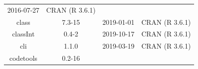 \documentclass[11pt,]{book}
\begin{document}
\begin{longtable}[]{@{}cccc@{}}
\begin{minipage}[t]{0.16\columnwidth}
2016-07-27\strut
\end{minipage} & \begin{minipage}[t]{0.36\columnwidth}\centering\strut
CRAN (R 3.6.1)\strut
\end{minipage}\tabularnewline
\begin{minipage}[t]{0.18\columnwidth}\centering\strut
class\strut
\end{minipage} & \begin{minipage}[t]{0.19\columnwidth}\centering\strut
7.3-15\strut
\end{minipage} & \begin{minipage}[t]{0.16\columnwidth}\centering\strut
2019-01-01\strut
\end{minipage} & \begin{minipage}[t]{0.36\columnwidth}\centering\strut
CRAN (R 3.6.1)\strut
\end{minipage}\tabularnewline
\begin{minipage}[t]{0.18\columnwidth}\centering\strut
classInt\strut
\end{minipage} & \begin{minipage}[t]{0.19\columnwidth}\centering\strut
0.4-2\strut
\end{minipage} & \begin{minipage}[t]{0.16\columnwidth}\centering\strut
2019-10-17\strut
\end{minipage} & \begin{minipage}[t]{0.36\columnwidth}\centering\strut
CRAN (R 3.6.1)\strut
\end{minipage}\tabularnewline
\begin{minipage}[t]{0.18\columnwidth}\centering\strut
cli\strut
\end{minipage} & \begin{minipage}[t]{0.19\columnwidth}\centering\strut
1.1.0\strut
\end{minipage} & \begin{minipage}[t]{0.16\columnwidth}\centering\strut
2019-03-19\strut
\end{minipage} & \begin{minipage}[t]{0.36\columnwidth}\centering\strut
CRAN (R 3.6.1)\strut
\end{minipage}\tabularnewline
\begin{minipage}[t]{0.18\columnwidth}\centering\strut
codetools\strut
\end{minipage} & \begin{minipage}[t]{0.19\columnwidth}\centering\strut
0.2-16\strut
\end{minipage} & \begin{minipage}[t]{0.16\columnwidth}\centering\strut

\end{minipage}
\end{longtable}
\end{document}
